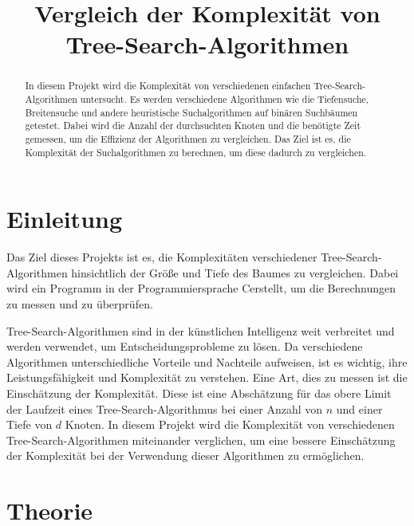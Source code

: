 \documentclass[a4paper,11pt]{article}
\title{Vergleich der Komplexität von \break Tree-Search-Algorithmen}
\author{}
\newcommand{\CC}{C\nolinebreak\hspace{-.05em}\raisebox{.4ex}{\tiny\bf +}\nolinebreak\hspace{-.10em}\raisebox{.4ex}{\tiny\bf +}\hspace{.1em}}
\begin{document}
\maketitle
\thispagestyle{empty}
\pagebreak
{}
\begin{abstract}
In diesem Projekt wird die Komplexität von verschiedenen einfachen Tree-Search-Algorithmen untersucht. Es werden verschiedene Algorithmen wie die Tiefensuche, Breitensuche und andere heuristische Suchalgorithmen auf binären Suchbäumen getestet. Dabei wird die Anzahl der durchsuchten Knoten und die benötigte Zeit gemessen, um die Effizienz der Algorithmen zu vergleichen. Das Ziel ist es, die Komplexität der Suchalgorithmen zu berechnen, um diese dadurch zu vergleichen.
\end{abstract}
\pagebreak
{%
  \hypersetup{hidelinks}
  \tableofcontents
}
\pagebreak


\section{Einleitung}
Das Ziel dieses Projekts ist es, die Komplexitäten verschiedener Tree-Search-Algorithmen hinsichtlich der Größe und Tiefe des Baumes zu vergleichen. Dabei wird ein Programm in der Programmiersprache \CC erstellt, um die Berechnungen zu messen und zu überprüfen. 

Tree-Search-Algorithmen sind in der künstlichen Intelligenz weit verbreitet und werden verwendet, um Entscheidungsprobleme zu lösen. Da verschiedene Algorithmen unterschiedliche Vorteile und Nachteile aufweisen, ist es wichtig, ihre Leistungsfähigkeit und Komplexität zu verstehen. Eine Art, dies zu messen ist die Einschätzung der Komplexität. Diese ist eine Abschätzung für das obere Limit der Laufzeit eines Tree-Search-Algorithmus bei einer Anzahl von $n$ und einer Tiefe von $d$ Knoten. In diesem Projekt wird die Komplexität von verschiedenen Tree-Search-Algorithmen miteinander verglichen, um eine bessere Einschätzung der Komplexität bei der Verwendung dieser Algorithmen zu ermöglichen.


\section{Theorie}
\end{document}
